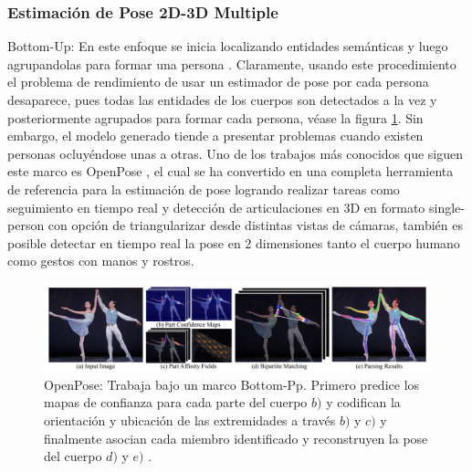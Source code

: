 \subsubsection{Estimación de Pose 2D-3D Multiple}


Bottom-Up: En este enfoque se inicia localizando entidades semánticas y luego agrupandolas
para formar una persona \cite{DBLP:journals/corr/abs-1804-06208} \cite{8578840}
\cite{DBLP:journals/corr/InsafutdinovPAA16}.
Claramente, usando este procedimiento el problema de rendimiento de usar un
estimador de pose por cada persona desaparece, pues todas las entidades de los cuerpos son detectados
a la vez y posteriormente agrupados para formar cada persona, véase la figura \ref{fig:Openpose}.
Sin embargo, el modelo generado tiende
a presentar problemas cuando existen personas ocluyéndose unas a otras. Uno de los trabajos
más conocidos que siguen este marco es OpenPose \cite{8765346}, el cual se ha convertido en una
completa herramienta de referencia para la estimación de pose logrando realizar tareas como
seguimiento en tiempo real y detección de articulaciones en 3D en formato single-person con
opción de triangularizar desde distintas vistas de cámaras, también es posible detectar en tiempo
real la pose en 2 dimensiones tanto el cuerpo humano como gestos con manos y rostros.

\begin{figure}[ht!]
    \centering
    \includegraphics[width=0.8 \textwidth]{Chapters/1. HPE_LUNG/figures/openpose.png}
    \caption{OpenPose: Trabaja bajo un marco Bottom-Pp. Primero predice los mapas de confianza para
             cada parte del cuerpo $b)$ y codifican la orientación y ubicación de las extremidades
             a través $b)$ y $c)$ y finalmente asocian cada miembro identificado y reconstruyen la
             pose del cuerpo $d)$ y $e)$ \cite{8765346}.}
    \label{fig:Openpose}
\end{figure}

